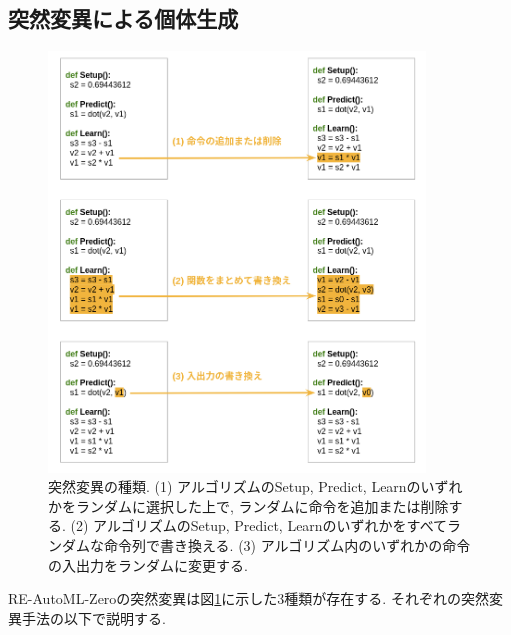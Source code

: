 \documentclass[11pt,oneside,openany,report]{jsbook}
\begin{document}
\subsection{突然変異による個体生成}\label{subsec:problem:existing_method:mutation}

\begin{figure}
  \centering
  \includegraphics[width=10cm]{mutation.png}
  \caption{突然変異の種類\cite{automl_zero}. (1) アルゴリズムのSetup, Predict, Learnのいずれかをランダムに選択した上で, ランダムに命令を追加または削除する. (2) アルゴリズムのSetup, Predict, Learnのいずれかをすべてランダムな命令列で書き換える. (3) アルゴリズム内のいずれかの命令の入出力をランダムに変更する. }
  \label{fig:re_automl_zero:mutation}
\end{figure}

RE-AutoML-Zeroの突然変異は図\ref{fig:re_automl_zero:mutation}に示した3種類が存在する. それぞれの突然変異手法の以下で説明する.
\end{document}
